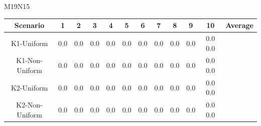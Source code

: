\documentclass{article}
\begin{document}
\begin{table}
M19N15\\
\begin{tabular}{ |c|c|c|c|c|c|c|c|c|c|c|c }
\hline
Scenario & 1 & 2 & 3 & 4 & 5 & 6 & 7 & 8 & 9 & 10 & Average\\
\hline
K1-Uniform & 0.0 & 0.0 & 0.0 & 0.0 & 0.0 & 0.0 & 0.0 & 0.0 & 0.0 & 0.0 0.0\\ \hline
K1-Non-Uniform & 0.0 & 0.0 & 0.0 & 0.0 & 0.0 & 0.0 & 0.0 & 0.0 & 0.0 & 0.0 0.0\\ \hline
K2-Uniform & 0.0 & 0.0 & 0.0 & 0.0 & 0.0 & 0.0 & 0.0 & 0.0 & 0.0 & 0.0 0.0\\ \hline
K2-Non-Uniform & 0.0 & 0.0 & 0.0 & 0.0 & 0.0 & 0.0 & 0.0 & 0.0 & 0.0 & 0.0 0.0\\ \hline
\end{tabular}
\end{table}
\end{document}
